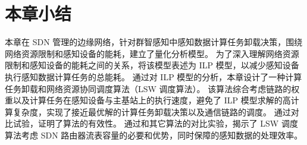 \section{本章小结}

本章在 SDN 管理的边缘网络，针对群智感知中感知数据计算任务卸载决策，围绕网络资源限制和感知设备的能耗，建立了量化分析模型。
为了深入理解网络资源限制和感知设备的能耗之间的关系，将该模型表述为 ILP 模型，以减少感知设备执行感知数据计算任务的总能耗。
通过对 ILP 模型的分析，本章设计了一种计算任务卸载和网络资源协同调度算法（LSW 调度算法）。
该算法综合考虑链路的权重以及计算任务在感知设备与主基站上的执行速度，避免了 ILP 模型求解的高计算复杂度，实现了接近最优解的计算任务卸载决策以及通信链路的调度。
通过对比试验，证明了算法的有效性。
通过和其它算法的对比实验，揭示了 LSW 调度算法考虑 SDN 路由器流表容量的必要和优势，同时保障的感知数据的处理效率。



